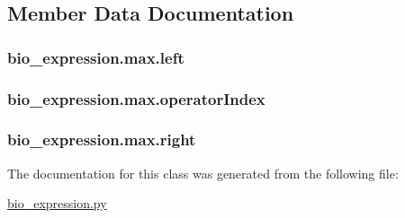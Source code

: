 \subsection{Member Data Documentation}
\hypertarget{classbio__expression_1_1max_a698892d9ef10ee244e421ebb437b82d3}{
\subsubsection[{left}]{\setlength{\rightskip}{0pt plus 5cm}bio\+\_\+expression.\+max.\+left}}\label{classbio__expression_1_1max_a698892d9ef10ee244e421ebb437b82d3}
\hypertarget{classbio__expression_1_1max_af109235d76eb1e03329a9b272d72d669}{
\subsubsection[{operator\+Index}]{\setlength{\rightskip}{0pt plus 5cm}bio\+\_\+expression.\+max.\+operator\+Index}}\label{classbio__expression_1_1max_af109235d76eb1e03329a9b272d72d669}
\hypertarget{classbio__expression_1_1max_afc52928c47bc1e28c66dab84a03f7be3}{
\subsubsection[{right}]{\setlength{\rightskip}{0pt plus 5cm}bio\+\_\+expression.\+max.\+right}}\label{classbio__expression_1_1max_afc52928c47bc1e28c66dab84a03f7be3}


The documentation for this class was generated from the following file\+:\begin{DoxyCompactItemize}
\item 
\hyperlink{bio__expression_8py}{bio\+\_\+expression.\+py}\end{DoxyCompactItemize}
